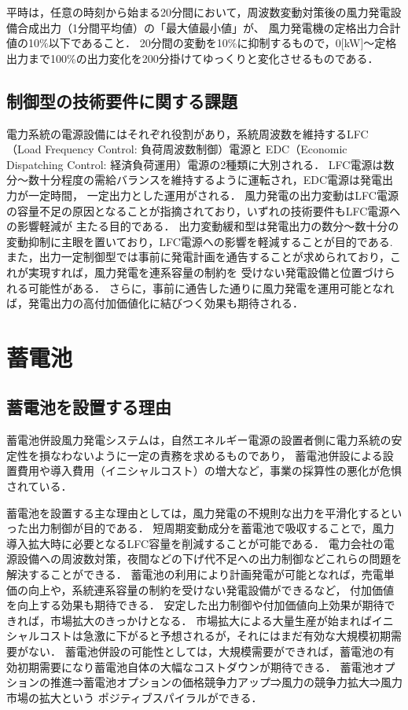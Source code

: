 \documentclass[a4paper,12pt,showkeys]{jreport}
\begin{document}
平時は，任意の時刻から始まる20分間において，周波数変動対策後の風力発電設備合成出力（1分間平均値）の「最大値\-最小値」が、
風力発電機の定格出力合計値の10\%以下であること．
20分間の変動を10\%に抑制するもので，0[kW]～定格出力まで100\%の出力変化を200分掛けてゆっくりと変化させるものである\cite{変動緩和}．

\subsection{制御型の技術要件に関する課題}

電力系統の電源設備にはそれぞれ役割があり，系統周波数を維持するLFC（Load Frequency Control: 負荷周波数制御）電源と
EDC（Economic Dispatching Control: 経済負荷運用）電源の2種類に大別される．
LFC電源は数分～数十分程度の需給バランスを維持するように運転され，EDC電源は発電出力が一定時間，
一定出力とした運用がされる．
風力発電の出力変動はLFC電源の容量不足の原因となることが指摘されており，いずれの技術要件もLFC電源への影響軽減が
主たる目的である．
出力変動緩和型は発電出力の数分～数十分の変動抑制に主眼を置いており，LFC電源への影響を軽減することが目的である.
また，出力一定制御型では事前に発電計画を通告することが求められており，これが実現すれば，風力発電を連系容量の制約を
受けない発電設備と位置づけられる可能性がある．
さらに，事前に通告した通りに風力発電を運用可能となれば，発電出力の高付加価値化に結びつく効果も期待される\cite{電力}．

\section{蓄電池}
\subsection{蓄電池を設置する理由}

蓄電池併設風力発電システムは，自然エネルギー電源の設置者側に電力系統の安定性を損なわないように一定の責務を求めるものであり，
蓄電池併設による設置費用や導入費用（イニシャルコスト）の増大など，事業の採算性の悪化が危惧されている．

蓄電池を設置する主な理由としては，風力発電の不規則な出力を平滑化するといった出力制御が目的である．
短周期変動成分を蓄電池で吸収することで，風力導入拡大時に必要となるLFC容量を削減することが可能である．
電力会社の電源設備への周波数対策，夜間などの下げ代不足への出力制御などこれらの問題を解決することができる．
蓄電池の利用により計画発電が可能となれば，売電単価の向上や，系統連系容量の制約を受けない発電設備ができるなど，
付加価値を向上する効果も期待できる．
安定した出力制御や付加価値向上効果が期待できれば，市場拡大のきっかけとなる．
市場拡大による大量生産が始まればイニシャルコストは急激に下がると予想されるが，それにはまだ有効な大規模初期需要がない．
蓄電池併設の可能性としては，大規模需要ができれば，蓄電池の有効初期需要になり蓄電池自体の大幅なコストダウンが期待できる．
蓄電池オプションの推進⇒蓄電池オプションの価格競争力アップ⇒風力の競争力拡大⇒風力市場の拡大という
ポジティブスパイラルができる\cite{併設}．
\end{document}
